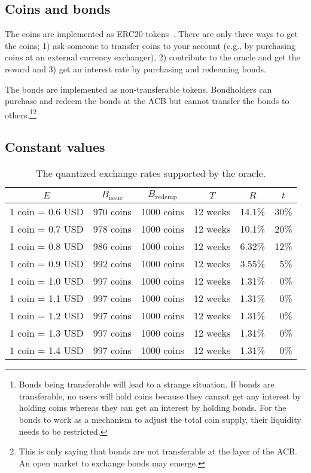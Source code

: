 \documentclass[dvipdfmx,a4paper]{article}
\begin{document}
\subsection{Coins and bonds}

The coins are implemented as ERC20 tokens~\cite{erc20token}. There are only three ways to get the coins; 1) ask someone to transfer coins to your account (e.g., by purchasing coins at an external currency exchanger), 2) contribute to the oracle and get the reward and 3) get an interest rate by purchasing and redeeming bonds.

The bonds are implemented as non-transferable tokens. Bondholders can purchase and redeem the bonds at the ACB but cannot transfer the bonds to others.\footnote{Bonds being transferable will lead to a strange situation. If bonds are transferable, no users will hold coins because they cannot get any interest by holding coins whereas they can get an interest by holding bonds. For the bonds to work as a mechanism to adjust the total coin supply, their liquidity needs to be restricted.}\footnote{This is only saying that bonds are not transferable at the layer of the ACB. An open market to exchange bonds may emerge.}

\subsection{Constant values}

\begin{table}[htb]
\begin{center}
\caption{The quantized exchange rates supported by the oracle.}\vspace{2ex}
\begin{tabular}{rrrrrr}\hline
\multicolumn{1}{c}{$E$} & \multicolumn{1}{c}{$B_{\mathrm{issue}}$} & \multicolumn{1}{c}{$B_{\mathrm{redemp}}$} & \multicolumn{1}{c}{$T$} & \multicolumn{1}{c}{$R$} & \multicolumn{1}{c}{$t$}\\\hline
1 coin = 0.6 USD & 970 coins & 1000 coins & 12 weeks & 14.1\% & 30\%\\
1 coin = 0.7 USD & 978 coins & 1000 coins & 12 weeks & 10.1\% & 20\%\\
1 coin = 0.8 USD & 986 coins & 1000 coins & 12 weeks & 6.32\% & 12\%\\
1 coin = 0.9 USD & 992 coins & 1000 coins & 12 weeks & 3.55\% & 5\%\\
1 coin = 1.0 USD & 997 coins & 1000 coins & 12 weeks & 1.31\% & 0\%\\
1 coin = 1.1 USD & 997 coins & 1000 coins & 12 weeks & 1.31\% & 0\%\\
1 coin = 1.2 USD & 997 coins & 1000 coins & 12 weeks & 1.31\% & 0\%\\
1 coin = 1.3 USD & 997 coins & 1000 coins & 12 weeks & 1.31\% & 0\%\\
1 coin = 1.4 USD & 997 coins & 1000 coins & 12 weeks & 1.31\% & 0\%\\\hline
\end{tabular}
\label{table1}
\end{center}
\end{table}
\end{document}
